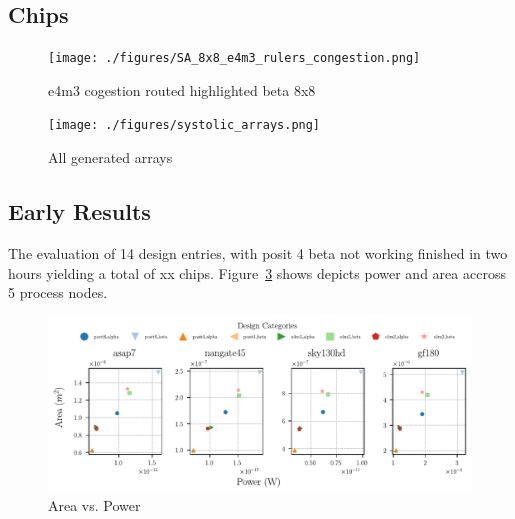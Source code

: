 \subsection{Chips}
\begin{figure}[H]
\centering
	\vspace{-0.5cm}
	\texttt{[image: ./figures/SA\_8x8\_e4m3\_rulers\_congestion.png]}
	\vspace{-0.5cm}
	\caption{e4m3 cogestion routed highlighted beta 8x8}
	\label{fig:focus on e4m3}
\end{figure}

\begin{figure}[H]
\centering
	\vspace{-0.5cm}
	\texttt{[image: ./figures/systolic\_arrays.png]}
	\vspace{-0.5cm}
	\caption{All generated arrays}
	\label{fig:all_arrays}
\end{figure}


\subsection{Early Results}

The evaluation of 14 design entries, with posit 4 beta not working finished in two hours yielding a total of xx chips.
Figure~\ref{fig:power_vs_area} shows depicts power and area accross 5 process nodes.
\begin{figure}[t]
\centering
	\vspace{-0.5cm}
	\includegraphics[width=\columnwidth]{./figures/power_vs_area_comparison.pdf}
	\vspace{-0.5cm}
	\caption{Area vs. Power}
	\label{fig:power_vs_area}
\end{figure}

